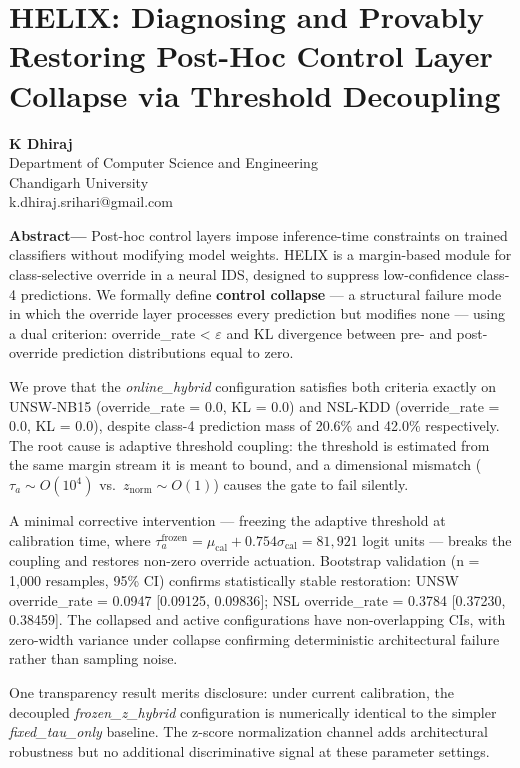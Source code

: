 \documentclass[
  conference]{IEEEtran}
\author{}
\date{}
\newcounter{none} %
\begin{document}
\section{HELIX: Diagnosing and Provably Restoring Post-Hoc Control Layer
Collapse via Threshold
Decoupling}\label{helix-diagnosing-and-provably-restoring-post-hoc-control-layer-collapse-via-threshold-decoupling}

\textbf{K Dhiraj}\\
Department of Computer Science and Engineering\\
Chandigarh University\\
k.dhiraj.srihari@gmail.com

\textbf{Abstract---} Post-hoc control layers impose inference-time
constraints on trained classifiers without modifying model weights.
HELIX is a margin-based module for class-selective override in a neural
IDS, designed to suppress low-confidence class-4 predictions. We
formally define \textbf{control collapse} --- a structural failure mode
in which the override layer processes every prediction but modifies none
--- using a dual criterion: override\_rate \textless{} \(\varepsilon\)
and KL divergence between pre- and post-override prediction
distributions equal to zero.

We prove that the \emph{online\_hybrid} configuration satisfies both
criteria exactly on UNSW-NB15 (override\_rate = 0.0, KL = 0.0) and
NSL-KDD (override\_rate = 0.0, KL = 0.0), despite class-4 prediction
mass of 20.6\% and 42.0\% respectively. The root cause is adaptive
threshold coupling: the threshold is estimated from the same margin
stream it is meant to bound, and a dimensional mismatch
(\(\tau_a \sim O(10^4)\) vs.~\(z_{\text{norm}} \sim O(1)\)) causes the
gate to fail silently.

A minimal corrective intervention --- freezing the adaptive threshold at
calibration time, where
\(\tau_a^{\text{frozen}} = \mu_{\text{cal}} + 0.754\sigma_{\text{cal}} = 81{,}921\)
logit units --- breaks the coupling and restores non-zero override
actuation. Bootstrap validation (n = 1,000 resamples, 95\% CI) confirms
statistically stable restoration: UNSW override\_rate = 0.0947
{[}0.09125, 0.09836{]}; NSL override\_rate = 0.3784 {[}0.37230,
0.38459{]}. The collapsed and active configurations have non-overlapping
CIs, with zero-width variance under collapse confirming deterministic
architectural failure rather than sampling noise.

One transparency result merits disclosure: under current calibration,
the decoupled \emph{frozen\_z\_hybrid} configuration is numerically
identical to the simpler \emph{fixed\_tau\_only} baseline. The z-score
normalization channel adds architectural robustness but no additional
discriminative signal at these parameter settings.
\end{document}
